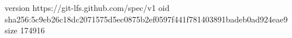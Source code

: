 version https://git-lfs.github.com/spec/v1
oid sha256:5c9eb26c18dc2071575d5ec0875b2ef0597f441f781403891badeb0ad924eae9
size 174916
